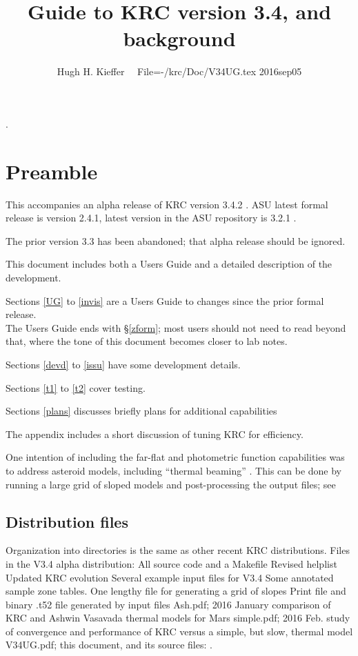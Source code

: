 \documentclass{article}
\title{Guide to KRC version 3.4, and background }
\author{Hugh H. Kieffer  \ \ File=-/krc/Doc/V34UG.tex  2016sep05}
\begin{document}
\maketitle
\tableofcontents
\listoffigures
\hrulefill .\hrulefill

\section{Preamble}
This accompanies an alpha release of KRC version 3.4.2 . ASU latest formal
release is version 2.4.1, latest version in the ASU repository is 3.2.1 .

The prior version 3.3 has been abandoned; that alpha release should be ignored.

This document includes both a Users Guide and a detailed description of the development.

Sections \ref{UG} to \ref{invis} are a Users Guide to changes since the prior formal release.
\\ The Users Guide ends with  \S \ref{zform}; most users should not need to read beyond that, where the tone of this document becomes closer to lab notes.  

Sections \ref{devd} to \ref{issu} have some development details.
 
Sections \ref{t1} to \ref{t2} cover testing.

Sections \ref{plans} discusses briefly plans for additional capabilities

The appendix includes a short discussion of tuning KRC for efficiency. 

One intention of including the far-flat and photometric function capabilities was
to address asteroid models, including ``thermal beaming'' . This can be done by
running a large grid of sloped models and post-processing the output files; see
 

\subsection{Distribution files}
 Organization into directories is the same as other recent KRC distributions. 
Files in the V3.4 alpha distribution: 
\qi All source code and a Makefile
\qi Revised helplist
\qi Updated KRC evolution 
\qi Several example input files for V3.4
\qii Some annotated sample zone tables.
\qii One lengthy file for generating a grid of slopes 
\qi Print file and binary .t52 file generated by input files
\qi Ash.pdf; 2016 January comparison of KRC and Ashwin Vasavada thermal models for Mars
\qi simple.pdf; 2016 Feb. study of convergence and performance of KRC versus a simple, but slow, thermal model
\qi V34UG.pdf; this document, and its source files: .
\end{document}
